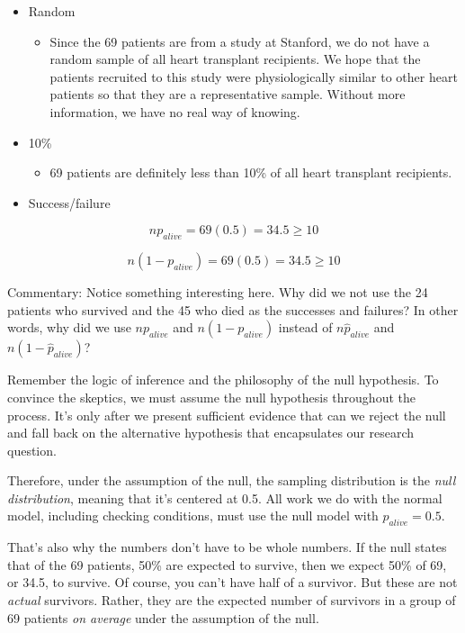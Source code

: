 \documentclass[
]{book}
\providecommand{\tightlist}{%
  \setlength{\itemsep}{0pt}\setlength{\parskip}{0pt}}
\begin{document}
\begin{itemize}
\tightlist
\item
  Random

  \begin{itemize}
  \tightlist
  \item
    Since the 69 patients are from a study at Stanford, we do not have a random sample of all heart transplant recipients. We hope that the patients recruited to this study were physiologically similar to other heart patients so that they are a representative sample. Without more information, we have no real way of knowing.
  \end{itemize}
\item
  10\%

  \begin{itemize}
  \tightlist
  \item
    69 patients are definitely less than 10\% of all heart transplant recipients.
  \end{itemize}
\item
  Success/failure
\end{itemize}

\[
np_{alive} = 69(0.5) = 34.5 \geq 10
\]

\[
n(1 - p_{alive}) = 69(0.5) = 34.5 \geq 10
\]

Commentary: Notice something interesting here. Why did we not use the 24 patients who survived and the 45 who died as the successes and failures? In other words, why did we use \(np_{alive}\) and \(n(1 - p_{alive})\) instead of \(n \hat{p}_{alive}\) and \(n(1 - \hat{p}_{alive})\)?

Remember the logic of inference and the philosophy of the null hypothesis. To convince the skeptics, we must assume the null hypothesis throughout the process. It's only after we present sufficient evidence that can we reject the null and fall back on the alternative hypothesis that encapsulates our research question.

Therefore, under the assumption of the null, the sampling distribution is the \emph{null distribution}, meaning that it's centered at 0.5. All work we do with the normal model, including checking conditions, must use the null model with \(p_{alive}= 0.5\).

That's also why the numbers don't have to be whole numbers. If the null states that of the 69 patients, 50\% are expected to survive, then we expect 50\% of 69, or 34.5, to survive. Of course, you can't have half of a survivor. But these are not \emph{actual} survivors. Rather, they are the expected number of survivors in a group of 69 patients \emph{on average} under the assumption of the null.
\end{document}
